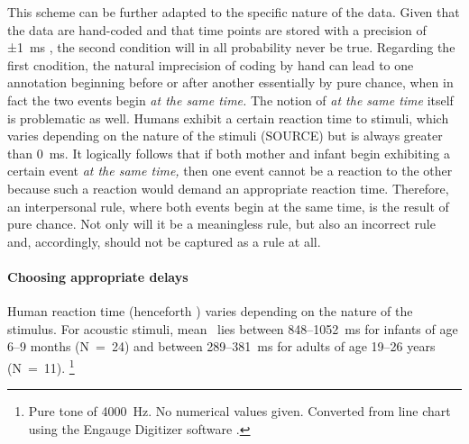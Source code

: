 This scheme can be further adapted to the specific nature of the data. Given that the data are hand-coded and that time points are stored with a precision of ±1~ms%
, the second condition will in all probability never be true. Regarding the first cnodition, the natural imprecision of coding by hand can lead to one annotation beginning before or after another essentially by pure chance, when in fact the two events begin \emph{at the same time.} The notion of \emph{at the same time} itself is problematic as well. Humans exhibit a certain reaction time to stimuli, which varies depending on the nature of the stimuli (SOURCE) but is always greater than 0~ms. It logically follows that if both mother and infant begin exhibiting a certain event \emph{at the same time,} then one event cannot be a reaction to the other because such a reaction would demand an appropriate reaction time. Therefore, an interpersonal rule, where both events begin at the same time, is the result of pure chance. Not only will it be a meaningless rule, but also an incorrect rule and, accordingly, should not be captured as a rule at all.

\paragraph{Choosing appropriate delays}
Human reaction time (henceforth \rt) varies depending on the nature of the stimulus. For acoustic stimuli, mean \rt\ lies  between 848--1052~ms for infants of age 6--9 months (N~=~24) and between 289--381~ms for adults of age 19--26 years (N~=~11).%
\footnote{Pure tone of 4000~Hz. No numerical values given. Converted from line chart using the Engauge Digitizer software \citep{mitchell02}.} 


